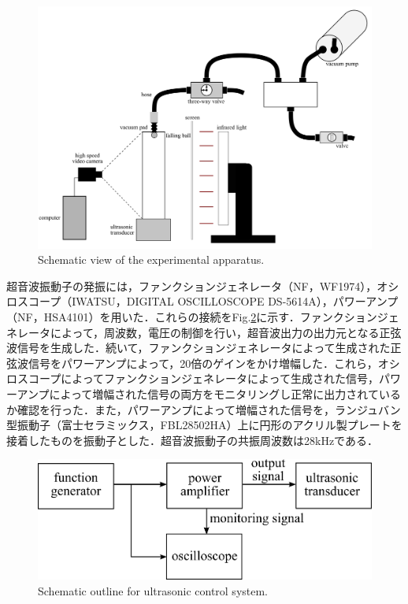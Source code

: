\begin{figure}[h]
    \centering
    \includegraphics[clip,width=15.0cm]{2-Methods/device.png}
    \caption{Schematic view of the experimental apparatus.}
    \label{fig:device}
\end{figure}

\newpage

超音波振動子の発振には，ファンクションジェネレータ（NF，WF1974），オシロスコープ（IWATSU，DIGITAL OSCILLOSCOPE DS-5614A），パワーアンプ（NF，HSA4101）を用いた．これらの接続をFig.\ref{fig:connect-with-signal}に示す．ファンクションジェネレータによって，周波数，電圧の制御を行い，超音波出力の出力元となる正弦波信号を生成した．続いて，ファンクションジェネレータによって生成された正弦波信号をパワーアンプによって，20倍のゲインをかけ増幅した．これら，オシロスコープによってファンクションジェネレータによって生成された信号，パワーアンプによって増幅された信号の両方をモニタリングし正常に出力されているか確認を行った．また，パワーアンプによって増幅された信号を，ランジュバン型振動子（富士セラミックス，FBL28502HA）上に円形のアクリル製プレートを接着したものを振動子とした．超音波振動子の共振周波数は28kHzである．

\begin{figure}[h]
    \centering
    \includegraphics[clip,width=15.0cm]{2-Methods/connect-with-signal.png}
    \caption{Schematic outline for ultrasonic control system.}
    \label{fig:connect-with-signal}
\end{figure}

